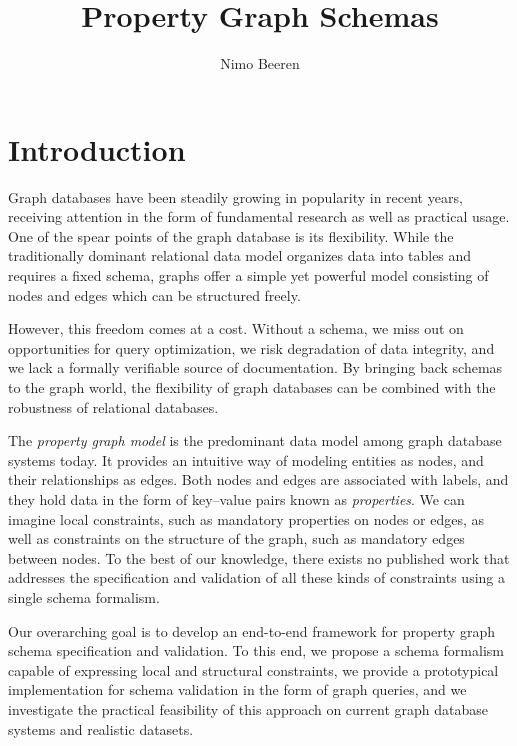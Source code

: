 \documentclass{report}
\title{Property Graph Schemas}
\author{Nimo Beeren}
\theoremstyle{definition}
\begin{document}
\maketitle

\renewcommand{\thepage}{\roman{page}}

\tableofcontents
\listoffigures
\listoftables
\lstlistoflistings

\chapter{Introduction}
\setcounter{page}{1}
\renewcommand{\thepage}{\arabic{page}}

Graph databases have been steadily growing in popularity in recent years, receiving attention in the form of fundamental research as well as practical usage. One of the spear points of the graph database is its flexibility. While the traditionally dominant relational data model organizes data into tables and requires a fixed schema, graphs offer a simple yet powerful model consisting of nodes and edges which can be structured freely.

However, this freedom comes at a cost. Without a schema, we miss out on opportunities for query optimization, we risk degradation of data integrity, and we lack a formally verifiable source of documentation. By bringing back schemas to the graph world, the flexibility of graph databases can be combined with the robustness of relational databases.

The \emph{property graph model} is the predominant data model among graph database systems today. It provides an intuitive way of modeling entities as nodes, and their relationships as edges. Both nodes and edges are associated with labels, and they hold data in the form of key--value pairs known as \emph{properties}. We can imagine local constraints, such as mandatory properties on nodes or edges, as well as constraints on the structure of the graph, such as mandatory edges between nodes. To the best of our knowledge, there exists no published work that addresses the specification and validation of all these kinds of constraints using a single schema formalism.

Our overarching goal is to develop an end-to-end framework for property graph schema specification and validation. To this end, we propose a schema formalism capable of expressing local and structural constraints, we provide a prototypical implementation for schema validation in the form of graph queries, and we investigate the practical feasibility of this approach on current graph database systems and realistic datasets.
\end{document}
